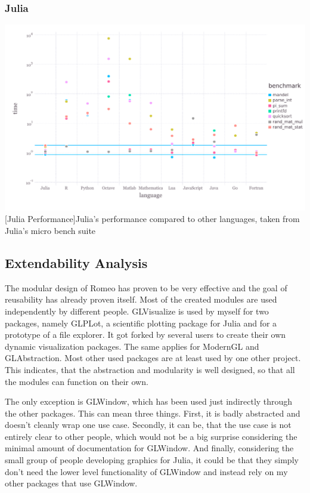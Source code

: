 \subsubsection{Julia}

\vspace{1em}
\begin{minipage}{\linewidth}
    \centering
    \includegraphics[width=0.9\linewidth]{graphics/juliabench.pdf}
    [Julia Performance]{Julia's performance compared to other languages, taken from Julia's micro bench suite}
    \label{fig:juliabench}
\end{minipage}


\subsection{Extendability Analysis}

The modular design of Romeo has proven to be very effective and the goal of reusability has already proven itself.
Most of the created modules are used independently by different people.
GLVisualize is used by myself for two packages, namely GLPLot, a scientific plotting package for Julia and for a prototype of a file explorer. 
It got forked by several users to create their own dynamic visualization packages.
The same applies for ModernGL and GLAbstraction. Most other used packages are at least used by one other project.
This indicates, that the abstraction and modularity is well designed, so that all the modules can function on their own.

The only exception is GLWindow, which has been used just indirectly through the other packages. 
This can mean three things.
First, it is badly abstracted and doesn't cleanly wrap one use case.
Secondly, it can be, that the use case is not entirely clear to other people, which would not be a big surprise considering the minimal amount of documentation for GLWindow.
And finally, considering the small group of people developing graphics for Julia, it could be that they simply don't need the lower level functionality of GLWindow and instead rely on my other packages that use GLWindow.

